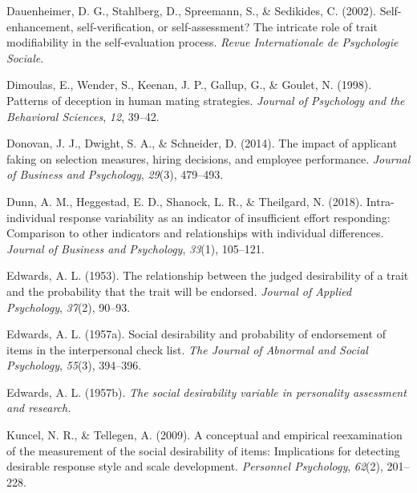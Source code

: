 \documentclass[
  ,jou]{apa6}
\newlength{\cslhangindent}
\newlength{\cslentryspacingunit} %
\newenvironment{CSLReferences}[2] %
 {%
  \setlength{\parindent}{0pt}
  \ifodd #1
  \let\oldpar\par
  \def\par{\hangindent=\cslhangindent\oldpar}
  \fi
  \setlength{\parskip}{#2\cslentryspacingunit}
 }%
 {}
\begin{document}
\begin{CSLReferences}{1}{0}
\leavevmode{}%
Dauenheimer, D. G., Stahlberg, D., Spreemann, S., \& Sedikides, C. (2002). Self-enhancement, self-verification, or self-assessment? The intricate role of trait modifiability in the self-evaluation process. \emph{Revue Internationale de Psychologie Sociale}.

\leavevmode{}%
Dimoulas, E., Wender, S., Keenan, J. P., Gallup, G., \& Goulet, N. (1998). Patterns of deception in human mating strategies. \emph{Journal of Psychology and the Behavioral Sciences}, \emph{12}, 39--42.

\leavevmode{}%
Donovan, J. J., Dwight, S. A., \& Schneider, D. (2014). The impact of applicant faking on selection measures, hiring decisions, and employee performance. \emph{Journal of Business and Psychology}, \emph{29}(3), 479--493.

\leavevmode{}%
Dunn, A. M., Heggestad, E. D., Shanock, L. R., \& Theilgard, N. (2018). Intra-individual response variability as an indicator of insufficient effort responding: Comparison to other indicators and relationships with individual differences. \emph{Journal of Business and Psychology}, \emph{33}(1), 105--121.

\leavevmode{}%
Edwards, A. L. (1953). The relationship between the judged desirability of a trait and the probability that the trait will be endorsed. \emph{Journal of Applied Psychology}, \emph{37}(2), 90--93.

\leavevmode{}%
Edwards, A. L. (1957a). Social desirability and probability of endorsement of items in the interpersonal check list. \emph{The Journal of Abnormal and Social Psychology}, \emph{55}(3), 394--396.

\leavevmode{}%
Edwards, A. L. (1957b). \emph{The social desirability variable in personality assessment and research.}

\leavevmode{}%
Kuncel, N. R., \& Tellegen, A. (2009). A conceptual and empirical reexamination of the measurement of the social desirability of items: Implications for detecting desirable response style and scale development. \emph{Personnel Psychology}, \emph{62}(2), 201--228.


\end{CSLReferences}
\end{document}

